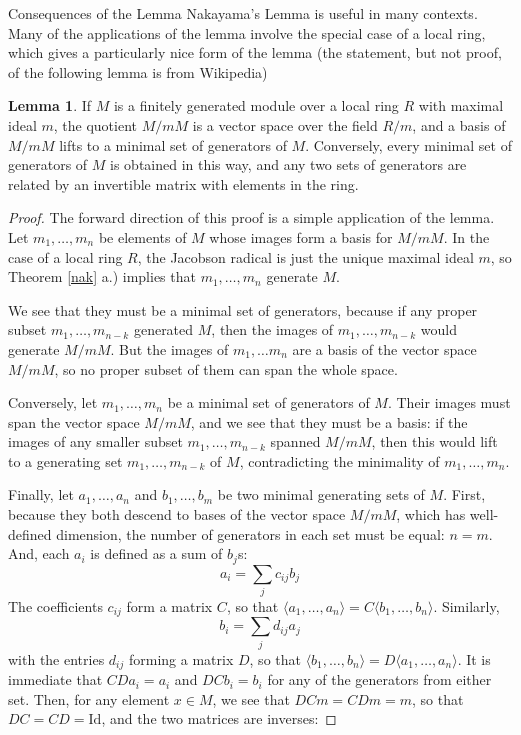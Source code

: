 \documentclass[12pt]{article}
\theoremstyle{definition}
\newtheorem{lemma}[definition]{Lemma}
\begin{document}
\begin{section}{Consequences of the Lemma}
	Nakayama's Lemma is useful in many contexts. Many of the applications of the lemma involve the special case of a local ring, which gives a particularly nice form of the lemma (the statement, but not proof, of the following lemma is from Wikipedia)
	\begin{lemma}
		If $M$ is a finitely generated module over a local ring $R$ with maximal ideal $m$, the quotient $M/mM$ is a vector space over the field $R/m$, and a basis of $M/mM$ lifts to a minimal set of generators of $M$. Conversely, every minimal set of generators of $M$ is obtained in this way, and any two sets of generators are related by an invertible matrix with elements in the ring. 
		\begin{proof}
		The forward direction of this proof is a simple application of the lemma. Let $m_1, \dots , m_n$ be elements of $M$ whose images form a basis for $M/mM$. In the case of a local ring $R$, the Jacobson radical is just the unique maximal ideal $m$, so Theorem \ref{nak} a.) implies that $m_1, \dots, m_n$ generate $M$. 
		\par We see that they must be a minimal set of generators, because if any proper subset $m_1, \dots, m_{n-k}$ generated $M$, then the images of $m_1, \dots , m_{n-k}$ would generate $M/mM$. But the images of $m_1, \dots m_n$ are a basis of the vector space $M/mM$, so no proper subset of them can span the whole space.
		\par Conversely, let $m_1, \dots, m_n$ be a minimal set of generators of $M$. Their images must span the vector space $M/mM$, and we see that they must be a basis: if the images of any smaller subset $m_1, \dots , m_{n-k}$ spanned $M/mM$, then this would lift to a generating set $m_1, \dots , m_{n-k}$ of $M$, contradicting the minimality of $m_1, \dots , m_n$.
		\par Finally, let $a_1, \dots, a_n$ and $b_1, \dots, b_m$ be two minimal generating sets of $M$. First, because they both descend to bases of the vector space $M/mM$, which has well-defined dimension, the number of generators in each set must be equal: $n = m$. And, each $a_i$ is defined as a sum of $b_j$s:
		\[a_i = \sum_{j}c_{ij}b_j\]
		The coefficients $c_{ij}$ form a matrix $C$, so that $\langle a_1, \dots, a_n\rangle = C \langle b_1, \dots, b_n\rangle$. Similarly,
		\[ b_i = \sum_{j}d_{ij}a_j\]
		with the entries $d_{ij}$ forming a matrix $D$, so that $\langle b_1, \dots , b_n\rangle = D \langle a_1, \dots , a_n\rangle$. It is immediate that $CDa_i = a_i$ and $DCb_i = b_i$ for any of the generators from either set. Then, for any element $x \in M$, we see that $DCm = CDm = m$, so that $DC = CD = \text{Id}$, and the two matrices are inverses:

\end{proof}
\end{lemma}
\end{section}
\end{document}
